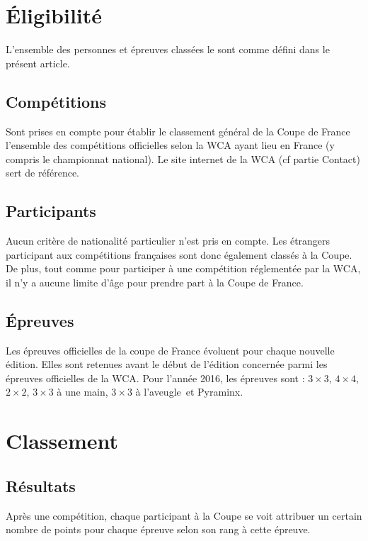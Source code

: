 \documentclass[10pt,a4paper]{article}
\newcommand{\3}{$3\times3$}
\newcommand{\4}{$4\times4$}
\newcommand{\2}{$2\times2$}
\newcommand{\oh}{$3\times3$ à une main}
\newcommand{\bld}{$3\times3$ à l'aveugle}
\newcommand{\pyra}{Pyraminx}
\begin{document}
\section{Éligibilité}

L'ensemble des personnes et épreuves classées le sont comme défini dans le présent article.

\subsection{Compétitions}

Sont prises en compte pour établir le classement général de la Coupe de France l'ensemble des compétitions officielles selon la WCA ayant lieu en France (y compris le championnat national). Le site internet de la WCA (cf partie Contact) sert de référence.

\subsection{Participants}

Aucun critère de nationalité particulier n'est pris en compte. Les étrangers participant aux compétitions françaises sont donc également classés à la Coupe. De plus, tout comme pour participer à une compétition réglementée par la WCA, il n'y a aucune limite d'âge pour prendre part à la Coupe de France.

\subsection{Épreuves}

Les épreuves officielles de la coupe de France évoluent pour chaque nouvelle édition. Elles sont retenues avant le début de l'édition concernée parmi les épreuves officielles de la WCA. Pour l'année 2016, les épreuves sont : \3, \4, \2, \oh, \bld\ et \pyra.

\pagebreak

\section{Classement}

\subsection{Résultats}

Après une compétition, chaque participant à la Coupe se voit attribuer un certain nombre de points pour chaque épreuve selon son rang à cette épreuve.
\end{document}
